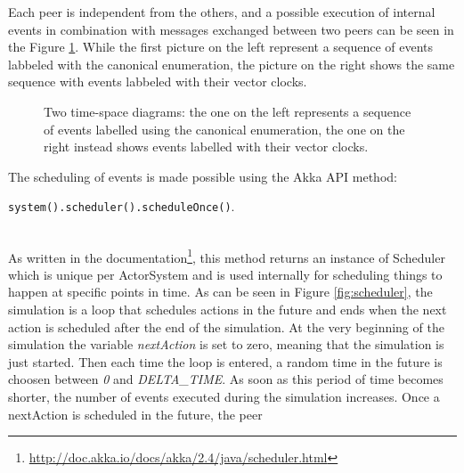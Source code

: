 \documentclass[11pt]{article}
\newcommand{\code}[1]{\colorbox{codegray}{\texttt{#1}}}
\begin{document}


\noindent
Each peer is independent from the others, and a possible execution of internal events in combination with messages exchanged between two peers can be seen in the Figure \ref{fig:time_space_diagrams}. While the first picture on the left represent a sequence of events labbeled with the canonical enumeration, the picture on the right shows the same sequence with events labbeled with their vector clocks.

\begin{figure}[ht]
	\centering
	\begin{minipage}{.5\textwidth}
	  \scalebox{.8}{}
	\end{minipage}%
	\begin{minipage}{.5\textwidth}
	  \scalebox{.8}{}
	\end{minipage}
	\caption{Two time-space diagrams: the one on the left represents a sequence of events labelled using the canonical enumeration, the one on the right instead shows events labelled with their vector clocks.}
	\label{fig:time_space_diagrams}
\end{figure}

\noindent
The scheduling of events is made possible using the Akka API method: \\ \vspace{0.2cm}
\centerline{\code{system().scheduler().scheduleOnce()}.}\\
\noindent
As written in the documentation\footnote{\url{http://doc.akka.io/docs/akka/2.4/java/scheduler.html}}, this method returns an instance of Scheduler which is unique per ActorSystem and is used internally for scheduling things to happen at specific points in time. As can be seen in Figure \ref{fig:scheduler}, the simulation is a loop that schedules actions in the future and ends when the next action is scheduled after the end of the simulation. At the very beginning of the simulation the variable \textit{nextAction} is set to zero, meaning that the simulation is just started. Then each time the loop is entered, a random time in the future is choosen between \textit{0} and \textit{DELTA\_TIME}. As soon as this period of time becomes shorter, the number of events executed during the simulation increases. Once a nextAction is scheduled in the future, the peer
\end{document}

